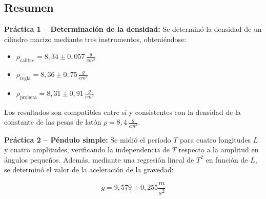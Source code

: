 \subsection{Resumen}
\label{subsec:resumen}


\textbf{Práctica 1 -- Determinación de la densidad:} Se determinó la densidad de un cilindro macizo mediante tres instrumentos, obteniéndose:

\begin{itemize}
    \item $\rho_{\text{calibre}} = 8{,}34 \pm 0{,}057 \, \frac{g}{cm^3}$
    \item $\rho_{\text{regla}} = 8{,}36 \pm 0{,}75 \, \frac{g}{cm^3}$
    \item $\rho_{\text{probeta}} = 8{,}31 \pm 0{,}91 \, \frac{g}{cm^3}$
\end{itemize}

Los resultados son compatibles entre sí y consistentes con la densidad de la constante de las pesas de latón $\rho = 8{,}4 \, \frac{g}{cm^3}$.


\textbf{Práctica 2 -- Péndulo simple:} Se midió el período $T$ para cuatro longitudes $L$ y cuatro amplitudes, verificando la independencia de $T$ respecto a la amplitud en ángulos pequeños.
Además, mediante una regresión lineal de $T^2$ en función de $L$, se determinó el valor de la aceleración de la gravedad:

\begin{equation*}
    g = 9{,}579 \pm 0{,}255 \frac{m}{s^2}
\end{equation*}
